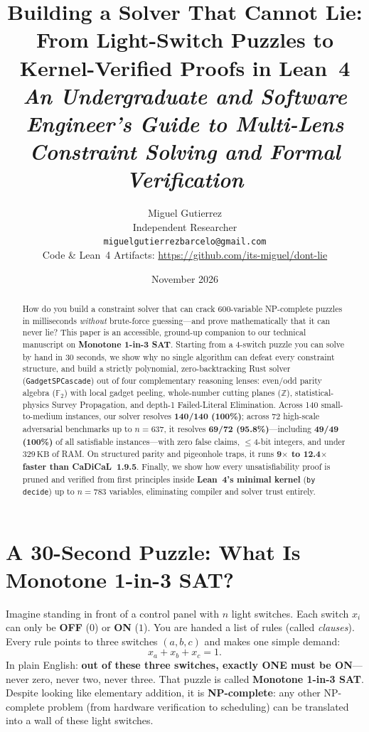 \documentclass[11pt]{article}
\title{\textbf{\Large Building a Solver That Cannot Lie:\\
From Light-Switch Puzzles to Kernel-Verified Proofs in Lean~4}\\[4pt]
{\normalsize\itshape An Undergraduate and Software Engineer's Guide to Multi-Lens Constraint Solving and Formal Verification}}
\author{Miguel Gutierrez\\
\small Independent Researcher\\
\small \texttt{miguelgutierrezbarcelo@gmail.com}\\
\small Code \& Lean~4 Artifacts: \url{https://github.com/its-miguel/dont-lie}}
\date{November 2026}
\begin{document}
\maketitle

\begin{abstract}
How do you build a constraint solver that can crack 600-variable NP-complete puzzles in milliseconds \emph{without} brute-force guessing---and prove mathematically that it can never lie? This paper is an accessible, ground-up companion to our technical manuscript on \textbf{Monotone 1-in-3 SAT}. Starting from a 4-switch puzzle you can solve by hand in 30 seconds, we show why no single algorithm can defeat every constraint structure, and build a strictly polynomial, zero-backtracking Rust solver (\texttt{GadgetSPCascade}) out of four complementary reasoning lenses: even/odd parity algebra ($\mathbb{F}_2$) with local gadget peeling, whole-number cutting planes ($\mathbb{Z}$), statistical-physics Survey Propagation, and depth-1 Failed-Literal Elimination. Across 140 small-to-medium instances, our solver resolves \textbf{140/140 (100\%)}; across 72 high-scale adversarial benchmarks up to $n = 637$, it resolves \textbf{69/72 (95.8\%)}---including \textbf{49/49 (100\%)} of all satisfiable instances---with zero false claims, $\le 4$-bit integers, and under $329\,\text{KB}$ of RAM. On structured parity and pigeonhole traps, it runs \textbf{9$\times$ to 12.4$\times$ faster than CaDiCaL~1.9.5}. Finally, we show how every unsatisfiability proof is pruned and verified from first principles inside \textbf{Lean~4's minimal kernel} (\texttt{by decide}) up to $n = 783$ variables, eliminating compiler and solver trust entirely.
\end{abstract}

\section{A 30-Second Puzzle: What Is Monotone 1-in-3 SAT?}

Imagine standing in front of a control panel with $n$ light switches. Each switch $x_i$ can only be \textbf{OFF} ($0$) or \textbf{ON} ($1$). You are handed a list of rules (called \emph{clauses}). Every rule points to three switches $(a, b, c)$ and makes one simple demand:
\[
x_a + x_b + x_c = 1.
\]
In plain English: \textbf{out of these three switches, exactly ONE must be ON}---never zero, never two, never three. That puzzle is called \textbf{Monotone 1-in-3 SAT}. Despite looking like elementary addition, it is \textbf{NP-complete}: any other NP-complete problem (from hardware verification to scheduling) can be translated into a wall of these light switches.
\end{document}
